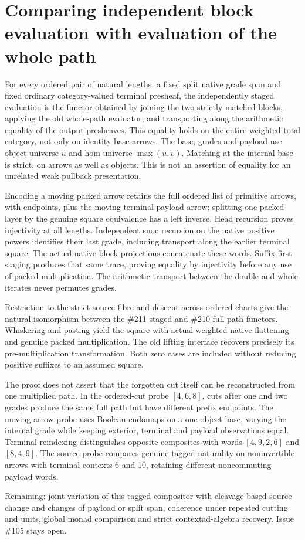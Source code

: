 \documentclass{article}
\begin{document}
\section*{Comparing independent block evaluation with evaluation of the whole path}
For every ordered pair of natural lengths, a fixed split native grade span and fixed ordinary category-valued terminal presheaf, the independently staged evaluation is the functor obtained by joining the two strictly matched blocks, applying the old whole-path evaluator, and transporting along the arithmetic equality of the output presheaves. This equality holds on the entire weighted total category, not only on identity-base arrows. The base, grades and payload use object universe $u$ and hom universe $\max(u,v)$. Matching at the internal base is strict, on arrows as well as objects. This is not an assertion of equality for an unrelated weak pullback presentation.
\par Encoding a moving packed arrow retains the full ordered list of primitive arrows, with endpoints, plus the moving terminal payload arrow; splitting one packed layer by the genuine square equivalence has a left inverse. Head recursion proves injectivity at all lengths. Independent snoc recursion on the native positive powers identifies their last grade, including transport along the earlier terminal square. The actual native block projections concatenate these words. Suffix-first staging produces that same trace, proving equality by injectivity before any use of packed multiplication. The arithmetic transport between the double and whole iterates never permutes grades.
\par Restriction to the strict source fibre and descent across ordered charts give the natural isomorphism between the \#211 staged and \#210 full-path functors. Whiskering and pasting yield the square with actual weighted native flattening and genuine packed multiplication. The old lifting interface recovers precisely its pre-multiplication transformation. Both zero cases are included without reducing positive suffixes to an assumed square.
\par The proof does not assert that the forgotten cut itself can be reconstructed from one multiplied path. In the ordered-cut probe $[4,6,8]$, cuts after one and two grades produce the same full path but have different prefix endpoints. The moving-arrow probe uses Boolean endomaps on a one-object base, varying the internal grade while keeping exterior, terminal and payload observations equal. Terminal reindexing distinguishes opposite composites with words $[4,9,2,6]$ and $[8,4,9]$. The source probe compares genuine tagged naturality on noninvertible arrows with terminal contexts 6 and 10, retaining different noncommuting payload words.
\par Remaining: joint variation of this tagged compositor with cleavage-based source change and changes of payload or split span, coherence under repeated cutting and units, global monad comparison and strict contextad-algebra recovery. Issue \#105 stays open.
\end{document}
